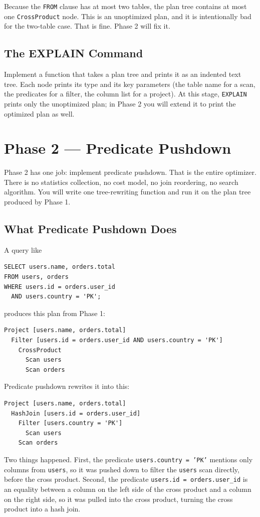 \documentclass[11pt,a4paper]{article}
\begin{document}
Because the \texttt{FROM} clause has at most two tables, the plan tree contains at most one \texttt{CrossProduct} node. This is an unoptimized plan, and it is intentionally bad for the two-table case. That is fine. Phase 2 will fix it.

\subsection{The EXPLAIN Command}
Implement a function that takes a plan tree and prints it as an indented text tree. Each node prints its type and its key parameters (the table name for a scan, the predicates for a filter, the column list for a project). At this stage, \texttt{EXPLAIN} prints only the unoptimized plan; in Phase 2 you will extend it to print the optimized plan as well.

\section{Phase 2 --- Predicate Pushdown}

Phase 2 has one job: implement predicate pushdown. That is the entire optimizer. There is no statistics collection, no cost model, no join reordering, no search algorithm. You will write one tree-rewriting function and run it on the plan tree produced by Phase 1.

\subsection{What Predicate Pushdown Does}
A query like
\begin{codebox}
\begin{lstlisting}
SELECT users.name, orders.total
FROM users, orders
WHERE users.id = orders.user_id
  AND users.country = 'PK';
\end{lstlisting}
\end{codebox}
produces this plan from Phase 1:
\begin{codebox}
\begin{lstlisting}
Project [users.name, orders.total]
  Filter [users.id = orders.user_id AND users.country = 'PK']
    CrossProduct
      Scan users
      Scan orders
\end{lstlisting}
\end{codebox}
Predicate pushdown rewrites it into this:
\begin{codebox}
\begin{lstlisting}
Project [users.name, orders.total]
  HashJoin [users.id = orders.user_id]
    Filter [users.country = 'PK']
      Scan users
    Scan orders
\end{lstlisting}
\end{codebox}
Two things happened. First, the predicate \texttt{users.country = 'PK'} mentions only columns from \texttt{users}, so it was pushed down to filter the \texttt{users} scan directly, before the cross product. Second, the predicate \texttt{users.id = orders.user\_id} is an equality between a column on the left side of the cross product and a column on the right side, so it was pulled into the cross product, turning the cross product into a hash join.
\end{document}
